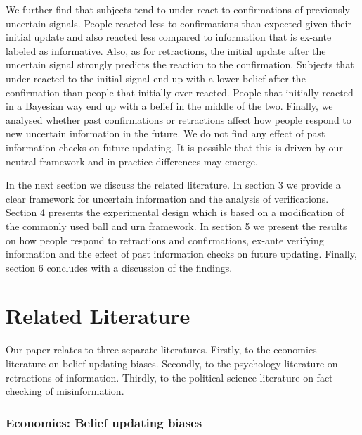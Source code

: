 \documentclass{article}
\begin{document}
We further find that subjects tend to under-react to confirmations of previously uncertain signals. People reacted less to confirmations than expected given their initial update and also reacted less compared to information that is ex-ante labeled as informative. Also, as for retractions, the initial update after the uncertain signal strongly predicts the reaction to the confirmation. Subjects that under-reacted to the initial signal end up with a lower belief after the confirmation than people that initially over-reacted. People that initially reacted in a Bayesian way end up with a belief in the middle of the two. Finally, we analysed whether past confirmations or retractions affect how people respond to new uncertain information in the future. We do not find any effect of past information checks on future updating. It is possible that this is driven by our neutral framework and in practice differences may emerge.

In the next section we discuss the related literature. In section 3 we provide a clear framework for uncertain information and the analysis of verifications. Section 4 presents the experimental design which is based on a modification of the commonly used ball and urn framework. In section 5 we present the results on how people respond to retractions and confirmations, ex-ante verifying information and the effect of past information checks on future updating. Finally, section 6 concludes with a discussion of the findings.


\section{Related Literature}

Our paper relates to three separate literatures. Firstly, to the economics literature on belief updating biases. Secondly, to the psychology literature on retractions of information. Thirdly, to the political science literature on fact-checking of misinformation.

\subsubsection*{Economics: Belief updating biases}
\end{document}
